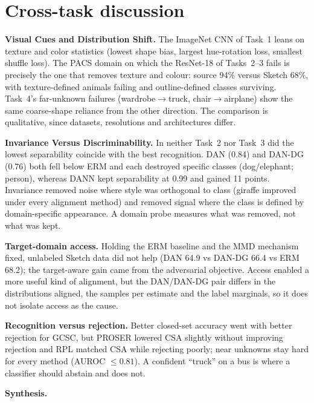 \documentclass{article}
\begin{document}
\section{Cross-task discussion}
\textbf{Visual Cues and Distribution Shift.} The ImageNet CNN of Task~1 leans on texture and color statistics (lowest shape bias, largest hue-rotation loss, smallest shuffle loss). The PACS domain on which the ResNet-18 of Tasks~2--3 fails is precisely the one that removes texture and colour: source 94\% versus Sketch 68\%, with texture-defined animals failing and outline-defined classes surviving. Task~4's far-unknown failures (wardrobe$\to$truck, chair$\to$airplane) show the same coarse-shape reliance from the other direction. The comparison is qualitative, since datasets, resolutions and architectures differ.

\textbf{Invariance Versus Discriminability.} In neither Task~2 nor Task~3 did the lowest separability coincide with the best recognition. DAN (0.84) and DAN-DG (0.76) both fell below ERM and each destroyed specific classes (dog/elephant; person), whereas DANN kept separability at 0.99 and gained 11 points. Invariance removed noise where style was orthogonal to class (giraffe improved under every alignment method) and removed signal where the class is defined by
domain-specific appearance. A domain probe measures what was removed, not what was kept.

\textbf{Target-domain access.} Holding the ERM baseline and the MMD mechanism fixed, unlabeled Sketch data did not help (DAN 64.9 vs DAN-DG 66.4 vs ERM 68.2); the target-aware gain came from the adversarial objective. Access enabled a more useful kind of alignment, but the DAN/DAN-DG pair differs in the distributions aligned, the samples per estimate and the
label marginals, so it does not isolate access as the cause.

\textbf{Recognition versus rejection.} Better closed-set accuracy went with better rejection for GCSC, but PROSER lowered CSA slightly without improving rejection and RPL matched CSA while rejecting poorly; near unknowns stay hard for every method (AUROC $\le0.81$). A confident ``truck'' on a bus is where a classifier should abstain and does not.

\textbf{Synthesis.} 
\end{document}
